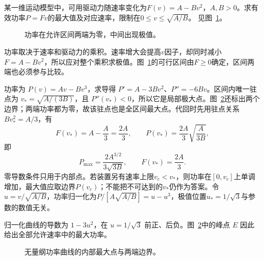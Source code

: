 \begin{exercise}[有效功率的最大值]\label{ex:c1-h3}
某一维运动模型中，可用驱动力随速率变化为$F(v)=A-Bv^2$，$A,B>0$。求有效功率$P=Fv$的最大值及对应速率，限制在$0\le v\le\sqrt{A/B}$。 见图~\ref{fig:c1-h3-q}。
\end{exercise}

\begin{figure}[H]\centering
{}
\caption{功率在允许区间两端为零，中间出现极值。}\label{fig:c1-h3-q}
\end{figure}
\begin{solution}
功率取决于速率和驱动力的乘积。速率增大会提高$v$因子，却同时减小$F=A-Bv^2$，所以应对整个乘积求极值。图~\ref{fig:c1-h3-q}的可行区间由$F\ge0$确定，区间两端也必须参与比较。


功率为 $P(v)=Av-Bv^3$，求导得 $P'=A-3Bv^2$、$P''=-6Bv$。区间内唯一驻点为 $v_* =\sqrt{A/(3B)}$，且 $P''(v_*)<0$，所以它是局部极大点。图~\ref{fig:c1-h3-s}还标出两个边界；两端功率都为零，故该驻点也是全区间最大点。代回时先用驻点关系 $Bv_*^2=A/3$，有
\[
F(v_*)=A-\frac A3=\frac{2A}{3},\qquad
P(v_*)=\frac{2A}{3}\sqrt{\frac{A}{3B}},
\]
即
\[\boxed{P_{\max}=\frac{2A^{3/2}}{3\sqrt{3B}},\qquad
F(v_*)=\frac{2A}3}.\]
零导数条件只用于内部点。若装置另有速率上限$v_c<v_*$，则功率在$[0,v_c]$上单调增加，最大值应取边界$P(v_c)$；不能把不可达到的$v_*$仍作为答案。令$u=v/\sqrt{A/B}$，功率归一化为$P/[A\sqrt{A/B}]=u-u^3$，极值位置$u_*=1/\sqrt3$与参数的数值无关。


归一化曲线的导数为 $1-3u^2$，在 $u=1/\sqrt3$ 前正、后负。图~\ref{fig:c1-h3-s}中的峰点 $E$ 因此给出全部允许速率中的最大功率。

\begin{figure}[H]\centering
{}
\caption{无量纲功率曲线的内部最大点与两端边界。}\label{fig:c1-h3-s}
\end{figure}
\end{solution}

